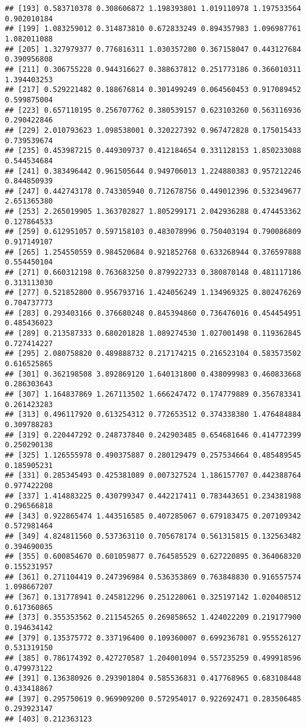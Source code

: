 \documentclass[
]{article}
\begin{document}
\begin{verbatim}
## [193] 0.583710378 0.308606872 1.198393801 1.019110978 1.197533564 0.902010184
## [199] 1.083259012 0.314873810 0.672833249 0.894357983 1.096987761 1.082011088
## [205] 1.327979377 0.776816311 1.030357280 0.367158047 0.443127684 0.390956808
## [211] 0.306755228 0.944316627 0.388637812 0.251773186 0.366010311 1.394403253
## [217] 0.529221482 0.188676814 0.301499249 0.064560453 0.917089452 0.599875004
## [223] 0.657110195 0.256707762 0.380539157 0.623103260 0.563116936 0.290422846
## [229] 2.010793623 1.098538001 0.320227392 0.967472828 0.175015433 0.739539674
## [235] 0.453987215 0.449309737 0.412184654 0.331128153 1.850233088 0.544534684
## [241] 0.383496442 0.961505644 0.949706013 1.224880383 0.957212246 0.844850939
## [247] 0.442743178 0.743305940 0.712678756 0.449012396 0.532349677 2.651365380
## [253] 2.265019905 1.363702827 1.805299171 2.042936288 0.474453362 0.127864533
## [259] 0.612951057 0.597158103 0.483078996 0.750403194 0.790086809 0.917149107
## [265] 1.254550559 0.984520684 0.921852768 0.633268944 0.376597888 0.554450104
## [271] 0.660312198 0.763683250 0.879922733 0.380870148 0.481117186 0.313113030
## [277] 0.521852800 0.956793716 1.424056249 1.134969325 0.802476269 0.704737773
## [283] 0.293403166 0.376680248 0.845394860 0.736476016 0.454454951 0.485436023
## [289] 0.213587333 0.680201828 1.089274530 1.027001498 0.119362845 0.727414227
## [295] 2.080758820 0.489888732 0.217174215 0.216523104 0.583573502 0.616525865
## [301] 0.362198508 3.892869120 1.640131800 0.438099983 0.460833668 0.286303643
## [307] 1.164837869 1.267113502 1.666247472 0.174779889 0.356783341 0.261423283
## [313] 0.496117920 0.613254312 0.772653512 0.374338380 1.476484884 0.309788283
## [319] 0.220447292 0.248737840 0.242903485 0.654681646 0.414772399 0.250290138
## [325] 1.126555978 0.490375887 0.280129479 0.257534664 0.485489545 0.185905231
## [331] 0.285345493 0.425381089 0.007327524 1.186157707 0.442388764 0.977422208
## [337] 1.414883225 0.430799347 0.442217411 0.783443651 0.234381988 0.296566818
## [343] 0.922865474 1.443516585 0.407285067 0.679183475 0.207109342 0.572981464
## [349] 4.824811560 0.537363110 0.705678174 0.561315815 0.132563482 0.394690035
## [355] 0.600854670 0.601059877 0.764585529 0.627220895 0.364068320 0.155231957
## [361] 0.271104419 0.247396984 0.536353869 0.763848830 0.916557574 1.098667207
## [367] 0.131778941 0.245812296 0.251228061 0.325197142 1.020408512 0.617360865
## [373] 0.355353562 0.211545265 0.269858652 1.424022209 0.219177900 0.194634142
## [379] 0.135375772 0.337196400 0.109360007 0.699236781 0.955526127 0.531319150
## [385] 0.786174392 0.427270587 1.204001094 0.557235259 0.499918596 0.479973122
## [391] 0.136380926 0.293901804 0.585536831 0.417768965 0.683108448 0.433418867
## [397] 0.295750619 0.969909200 0.572954017 0.922692471 0.283506485 0.293923147
## [403] 0.212363123
\end{verbatim}
\end{document}
